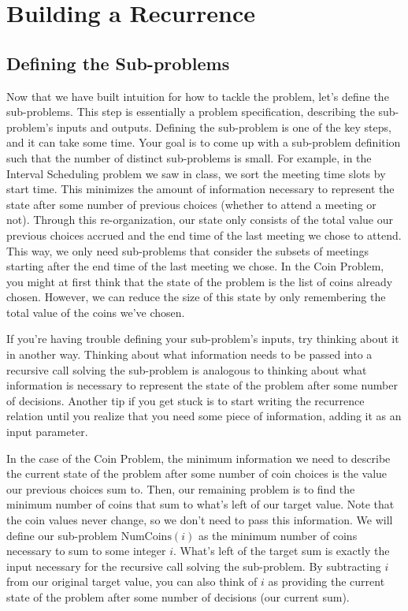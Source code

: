 \documentclass[11pt]{article}
\begin{document}
\section{Building a Recurrence}
\subsection*{Defining the Sub-problems}
\label{sec:definesubproblems}
Now that we have built intuition for how to tackle the problem, let's define the sub-problems. This step is essentially a problem specification, describing the sub-problem's inputs and outputs. Defining the sub-problem is one of the key steps, and it can take some time. Your goal is to come up with a sub-problem definition such that the number of distinct sub-problems is small. For example, in the Interval Scheduling problem we saw in class, we sort the meeting time slots by start time. This minimizes the amount of information necessary to represent the state after some number of previous choices (whether to attend a meeting or not). Through this re-organization, our state only consists of the total value our previous choices accrued and the end time of the last meeting we chose to attend. This way, we only need sub-problems that consider the subsets of meetings starting after the end time of the last meeting we chose. In the Coin Problem, you might at first think that the state of the problem is the list of coins already chosen. However, we can reduce the size of this state by only remembering the total value of the coins we've chosen.

If you're having trouble defining your sub-problem's inputs, try thinking about it in another way. Thinking about what information needs to be passed into a recursive call solving the sub-problem is analogous to thinking about what information is necessary to represent the state of the problem after some number of decisions. Another tip if you get stuck is to start writing the recurrence relation until you realize that you need some piece of information, adding it as an input parameter.

In the case of the Coin Problem, the minimum information we need to describe the current state of the problem after some number of coin choices is the value our previous choices sum to. Then, our remaining problem is to find the minimum number of coins that sum to what's left of our target value. Note that the coin values never change, so we don't need to pass this information. We will define our sub-problem $\mathrm{NumCoins}(i)$ as the minimum number of coins necessary to sum to some integer $i$. What's left of the target sum is exactly the input necessary for the recursive call solving the sub-problem. By subtracting $i$ from our original target value, you can also think of $i$ as providing the current state of the problem after some number of decisions (our current sum).
\end{document}
